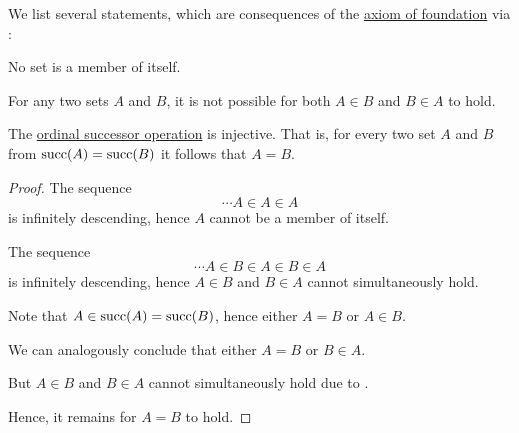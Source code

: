 \begin{corollary}\label{thm:simple_foundation_theorems}
  We list several statements, which are consequences of the \hyperref[def:zfc/foundation]{axiom of foundation} via :

  \begin{thmenum}
     No set is a member of itself.

     For any two sets \( A \) and \( B \), it is not possible for both \( A \in B \) and \( B \in A \) to hold.

     The \hyperref[def:ordinal_successor]{ordinal successor operation} is injective. That is, for every two set \( A \) and \( B \) from \( \operatorname{succ}(A) = \operatorname{succ}(B) \) it follows that \( A = B \).
  \end{thmenum}
\end{corollary}
\begin{proof}
   The sequence
  \begin{equation*}
    \cdots A \in A \in A
  \end{equation*}
  is infinitely descending, hence \( A \) cannot be a member of itself.

   The sequence
  \begin{equation*}
    \cdots A \in B \in A \in B \in A
  \end{equation*}
  is infinitely descending, hence \( A \in B \) and \( B \in A \) cannot simultaneously hold.

   Note that \( A \in \operatorname{succ}(A) = \operatorname{succ}(B) \), hence either \( A = B \) or \( A \in B \).

  We can analogously conclude that either \( A = B \) or \( B \in A \).

  But \( A \in B \) and \( B \in A \) cannot simultaneously hold due to .

  Hence, it remains for \( A = B \) to hold.
\end{proof}


